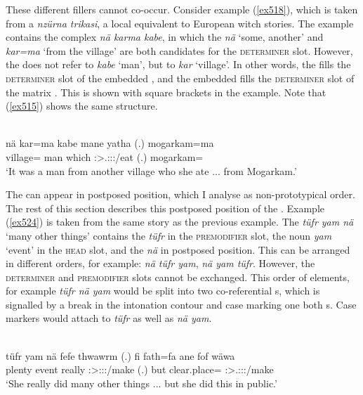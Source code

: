 These different fillers cannot co-occur. Consider example (\ref{ex518}), which is taken from a \emph{nzürna trikasi}, a local equivalent to European witch stories. The example contains the complex  \emph{nä karma kabe}, in which the  \emph{nä} `some, another' and \emph{kar=ma} `from the village' are both candidates for the \textsc{determiner} slot. However, the  does not refer to \emph{kabe} `man', but to \emph{kar} `village'. In other words, the  fills the \textsc{determiner} slot of the embedded , and the embedded  fills the \textsc{determiner} slot of the matrix . This is shown with square brackets in the example. Note that (\ref{ex515}) shows the same structure.

\begin{exe}
	\\
	\gll nä kar=ma kabe mane yatha (.) mogarkam=ma\\
	{\Indf} village={\Char} man which \Stsg:\Sbj>\Tsg.\Masc:\Obj:\Pst:\Ipfv/eat (.) mogarkam={\Char}\\
	\trans `It was a man from another village who she ate ... from Mogarkam.'\\
	\label{ex518}
\end{exe}

The  can appear in postposed position, which I analyse as non-prototypical order. The rest of this section describes this postposed position of the . Example (\ref{ex524}) is taken from the same story as the previous example. The  \emph{tüfr yam nä} `many other things' contains the  \emph{tüfr} in the \textsc{premodifier} slot, the noun \emph{yam} `event' in the \textsc{head} slot, and the  \emph{nä} in postposed position. This  can be arranged in different orders, for example: \emph{nä tüfr yam}, \emph{nä yam tüfr}. However, the \textsc{determiner} and \textsc{premodifier} slots cannot be exchanged. This order of elements, for example \emph{tüfr nä yam} would be split into two co-referential s, which is signalled by a break in the intonation contour and case marking one both s. Case markers would attach to \emph{tüfr} as well as \emph{nä yam}.

\begin{exe}
	\\
	\gll tüfr yam nä fefe thwawrm (.) fi fath=fa ane fof wäwa\\
	plenty event {\Indf} really \Sg:\Sbj>\Stpl:\Obj:\Pst:\Dur/make (.) but {clear.place=\Abl} {\Dem} {\Emph} \Sg:\Sbj>\Tsg.\F:\Obj:\Pst:\Ipfv/make\\
	\trans `She really did many other things ... but she did this in public.'\\
	\label{ex524}
\end{exe}

